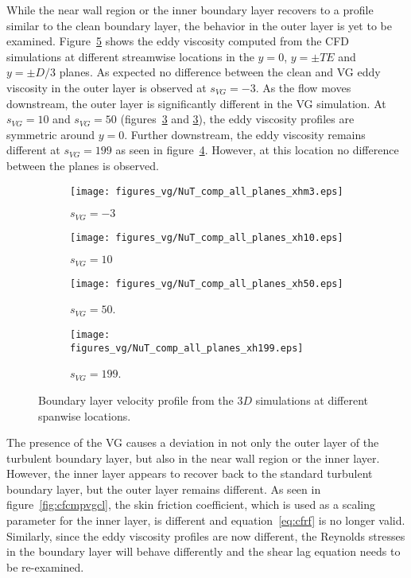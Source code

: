 While the near wall region or the inner boundary layer recovers to a profile similar to the clean boundary layer, the behavior in the outer layer is yet to be examined. Figure~\ref{fig:nutplan3d} shows the eddy viscosity computed from the CFD simulations at different streamwise locations in the $y=0$, $y=\pm TE$ and $y=\pm D/3$ planes. As expected no difference between the clean and VG eddy viscosity in the outer layer is observed at $s_{VG}=-3$. As the flow moves downstream, the outer layer is significantly different in the VG simulation. At $s_{VG}=10$ and $s_{VG}=50$ (figures~\ref{fig:nutplanxh50} and \ref{fig:nutplanxh50}), the eddy viscosity profiles are symmetric around $y=0$. Further downstream, the eddy viscosity remains different at $s_{VG}=199$ as seen in figure~\ref{fig:nutplanxh99}. However, at this location no difference between the planes is observed.
\begin{figure}[h!]
    \centering
    \captionsetup{justification=centering}
    \begin{subfigure}[b]{0.48\textwidth}
    \captionsetup{justification=centering}
        \texttt{[image: figures\_vg/NuT\_comp\_all\_planes\_xhm3.eps]}
        \caption{$s_{VG} = -3$}
        \label{fig:nutplanxhm3}
    \end{subfigure}
    \begin{subfigure}[b]{0.48\textwidth}
    \captionsetup{justification=centering}
        \texttt{[image: figures\_vg/NuT\_comp\_all\_planes\_xh10.eps]}
        \caption{$s_{VG} = 10$}
        \label{fig:nutplanxh10}
    \end{subfigure}
    \begin{subfigure}[b]{0.48\textwidth}
    \centering
    \captionsetup{justification=centering}
        \texttt{[image: figures\_vg/NuT\_comp\_all\_planes\_xh50.eps]}
        \caption{$s_{VG} = 50$.}
        \label{fig:nutplanxh50}
    \end{subfigure}
    \begin{subfigure}[b]{0.48\textwidth}
    \centering
    \captionsetup{justification=centering}
        \texttt{[image: figures\_vg/NuT\_comp\_all\_planes\_xh199.eps]}
        \caption{$s_{VG} = 199$.}
        \label{fig:nutplanxh99}
    \end{subfigure}
    \caption{Boundary layer velocity profile from the $3D$ simulations at different spanwise locations.}
    \label{fig:nutplan3d}
\end{figure}

The presence of the VG causes a deviation in not only the outer layer of the turbulent boundary layer, but also in the near wall region or the inner layer. However, the inner layer appears to recover back to the standard turbulent boundary layer, but the outer layer remains different. As seen in figure~\ref{fig:cfcmpvgcl}, the skin friction coefficient, which is used as a scaling parameter for the inner layer, is different and equation~\ref{eq:cfrf} is no longer valid. Similarly, since the eddy viscosity profiles are now different, the Reynolds stresses in the boundary layer will behave differently and the shear lag equation needs to be re-examined.

